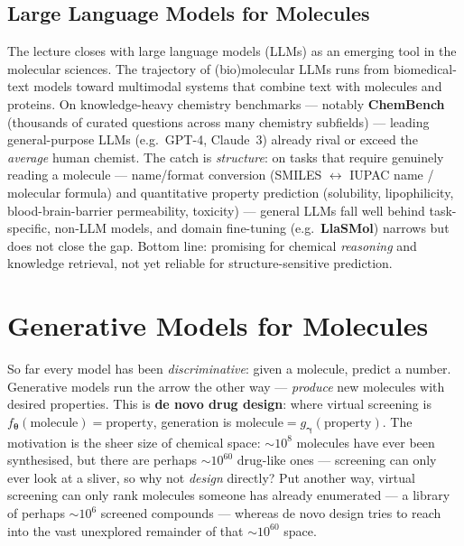 \documentclass[11pt, oneside]{book}
\newcommand{\params}{\boldsymbol{\theta}}   %
\begin{document}
\section{Large Language Models for Molecules}
\label{sec:llms}

The lecture closes with large language models (LLMs) as an emerging tool in the
molecular sciences. The trajectory of (bio)molecular LLMs runs from biomedical-text
models toward multimodal systems that combine text with molecules and proteins. On
knowledge-heavy chemistry benchmarks --- notably \textbf{ChemBench} (thousands of
curated questions across many chemistry subfields) --- leading general-purpose LLMs
(e.g.\ GPT-4, Claude~3) already rival or exceed the \emph{average} human chemist.
The catch is \emph{structure}: on tasks that require genuinely reading a molecule
--- name/format conversion (SMILES $\leftrightarrow$ IUPAC name / molecular formula)
and quantitative property prediction (solubility, lipophilicity, blood-brain-barrier
permeability, toxicity) --- general LLMs fall well behind task-specific, non-LLM
models, and domain fine-tuning (e.g.\ \textbf{LlaSMol}) narrows but does not close
the gap. Bottom line: promising for chemical \emph{reasoning} and knowledge
retrieval, not yet reliable for structure-sensitive prediction.


\chapter{Generative Models for Molecules}
\label{chap:generative}

So far every model has been \emph{discriminative}: given a molecule, predict a
number. Generative models run the arrow the other way --- \emph{produce} new
molecules with desired properties. This is \textbf{de novo drug design}: where
virtual screening is $f_{\params}(\text{molecule}) = \text{property}$, generation
is $\text{molecule} = g_{\bm\gamma}(\text{property})$. The motivation is the sheer
size of chemical space: $\sim$$10^{8}$ molecules have ever been synthesised, but
there are perhaps $\sim$$10^{60}$ drug-like ones --- screening can only ever look
at a sliver, so why not \emph{design} directly? Put another way, virtual screening can
only rank molecules someone has already enumerated --- a library of perhaps
$\sim$$10^{6}$ screened compounds --- whereas de novo design tries to reach into the
vast unexplored remainder of that $\sim$$10^{60}$ space.
\end{document}
